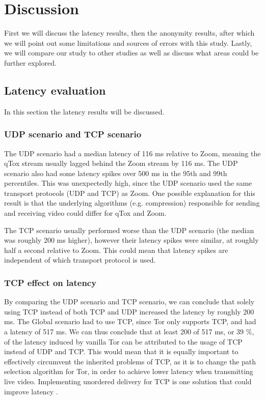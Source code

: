 \documentclass{kththesis}
\begin{document}
\chapter{Discussion}
First we will discuss the latency results, then the anonymity results, after which we will point out some limitations and sources of errors with this study. Lastly, we will compare our study to other studies as well as discuss what areas could be further explored. 

\section{Latency evaluation}
In this section the latency results will be discussed.

\subsection{UDP scenario and TCP scenario}
The UDP scenario had a median latency of 116 ms relative to Zoom, meaning the qTox stream usually lagged behind the Zoom stream by 116 ms. The UDP scenario also had some latency spikes over 500 ms in the 95th and 99th percentiles. This was unexpectedly high, since the UDP scenario used the same transport protocols (UDP and TCP) as Zoom. One possible explanation for this result is that the underlying algorithms (e.g. compression) responsible for sending and receiving video could differ for qTox and Zoom. 

The TCP scenario usually performed worse than the UDP scenario (the median was roughly 200 ms higher), however their latency spikes were similar, at roughly half a second relative to Zoom. This could mean that latency spikes are independent of which transport protocol is used.

\subsection{TCP effect on latency}
By comparing the UDP scenario and TCP scenario, we can conclude that solely using TCP instead of both TCP and UDP increased the latency by roughly 200 ms. The Global scenario had to use TCP, since Tor only supports TCP, and had a latency of 517 ms. We can thus conclude that at least 200 of 517 ms, or 39 \%, of the latency induced by vanilla Tor can be attributed to the usage of TCP instead of UDP and TCP. This would mean that it is equally important to effectively circumvent the inherited problems of TCP, as it is to change the path selection algorithm for Tor, in order to achieve lower latency when transmitting live video. Implementing unordered delivery for TCP is one solution that could improve latency \parencite{unorderedTCPdelivery}. 
\end{document}
